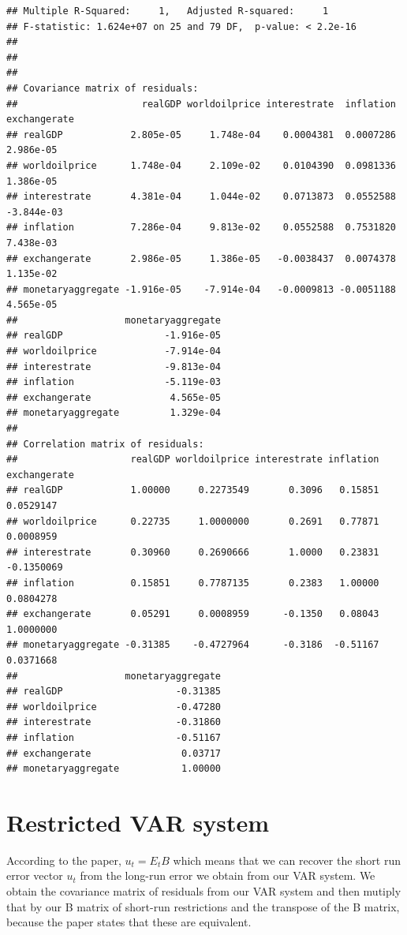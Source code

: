 \documentclass[11pt,preprint, authoryear]{elsarticle}
\numberwithin{equation}{section}
\numberwithin{figure}{section}
\numberwithin{table}{section}
\begin{document}
\begin{verbatim}
## Multiple R-Squared:     1,   Adjusted R-squared:     1 
## F-statistic: 1.624e+07 on 25 and 79 DF,  p-value: < 2.2e-16 
## 
## 
## 
## Covariance matrix of residuals:
##                      realGDP worldoilprice interestrate  inflation exchangerate
## realGDP            2.805e-05     1.748e-04    0.0004381  0.0007286    2.986e-05
## worldoilprice      1.748e-04     2.109e-02    0.0104390  0.0981336    1.386e-05
## interestrate       4.381e-04     1.044e-02    0.0713873  0.0552588   -3.844e-03
## inflation          7.286e-04     9.813e-02    0.0552588  0.7531820    7.438e-03
## exchangerate       2.986e-05     1.386e-05   -0.0038437  0.0074378    1.135e-02
## monetaryaggregate -1.916e-05    -7.914e-04   -0.0009813 -0.0051188    4.565e-05
##                   monetaryaggregate
## realGDP                  -1.916e-05
## worldoilprice            -7.914e-04
## interestrate             -9.813e-04
## inflation                -5.119e-03
## exchangerate              4.565e-05
## monetaryaggregate         1.329e-04
## 
## Correlation matrix of residuals:
##                    realGDP worldoilprice interestrate inflation exchangerate
## realGDP            1.00000     0.2273549       0.3096   0.15851    0.0529147
## worldoilprice      0.22735     1.0000000       0.2691   0.77871    0.0008959
## interestrate       0.30960     0.2690666       1.0000   0.23831   -0.1350069
## inflation          0.15851     0.7787135       0.2383   1.00000    0.0804278
## exchangerate       0.05291     0.0008959      -0.1350   0.08043    1.0000000
## monetaryaggregate -0.31385    -0.4727964      -0.3186  -0.51167    0.0371668
##                   monetaryaggregate
## realGDP                    -0.31385
## worldoilprice              -0.47280
## interestrate               -0.31860
## inflation                  -0.51167
## exchangerate                0.03717
## monetaryaggregate           1.00000
\end{verbatim}

\hypertarget{restricted-var-system}{%
\section{Restricted VAR system}\label{restricted-var-system}}

According to the paper, \(u_t=E_tB\) which means that we can recover the
short run error vector \(u_t\) from the long-run error we obtain from
our VAR system. We obtain the covariance matrix of residuals from our
VAR system and then mutiply that by our B matrix of short-run
restrictions and the transpose of the B matrix, because the paper states
that these are equivalent.
\end{document}
